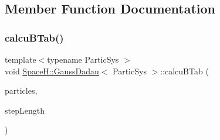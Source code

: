 \subsection{Member Function Documentation}
\mbox{\label{class_space_h_1_1_gauss_dadau_ac7089493b28c3c3ed67dc875e172b40c}} 
\subsubsection{\texorpdfstring{calcu\+B\+Tab()}{calcuBTab()}}
{\footnotesize\ttfamily template$<$typename Partic\+Sys $>$ \\
void \mbox{\hyperlink{class_space_h_1_1_gauss_dadau}{Space\+H\+::\+Gauss\+Dadau}}$<$ Partic\+Sys $>$\+::calcu\+B\+Tab (\begin{DoxyParamCaption}\item[{const Partic\+Sys \&}]{particles,  }\item[{\mbox{\hyperlink{class_space_h_1_1_gauss_dadau_ace42540e9fb47d7f1d1f00622bbd1ccb}{Scalar}}}]{step\+Length }\end{DoxyParamCaption})\hspace{0.3cm}{\ttfamily [inline]}}

